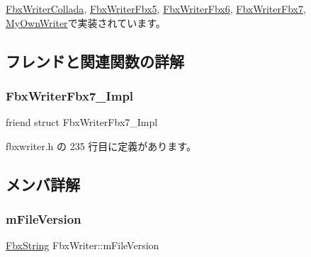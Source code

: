 \hyperlink{class_fbx_writer_collada_aaf5a632f5fa72c521d578ad17ae0aea1}{Fbx\+Writer\+Collada}, \hyperlink{class_fbx_writer_fbx5_a50a64e5e28a3ae1a89aa7107b80b7d26}{Fbx\+Writer\+Fbx5}, \hyperlink{class_fbx_writer_fbx6_a27073868a5a3c4b315e443032916d7d7}{Fbx\+Writer\+Fbx6}, \hyperlink{class_fbx_writer_fbx7_abc9fcf2cf7e1ed96f87bdc67f05f9545}{Fbx\+Writer\+Fbx7}, \hyperlink{class_my_own_writer_a7ec7a323efec7306c17198a469667d1e}{My\+Own\+Writer}で実装されています。



\subsection{フレンドと関連関数の詳解}
\mbox{\label{class_fbx_writer_af1c8c15ac15cf43655af7772383daefd}} 
\subsubsection{\texorpdfstring{Fbx\+Writer\+Fbx7\+\_\+\+Impl}{FbxWriterFbx7\_Impl}}
{\footnotesize\ttfamily friend struct Fbx\+Writer\+Fbx7\+\_\+\+Impl\hspace{0.3cm}{\ttfamily [friend]}}



 fbxwriter.\+h の 235 行目に定義があります。



\subsection{メンバ詳解}
\mbox{\label{class_fbx_writer_a134d9a05d8c34cae98d3c782b98ea801}} 
\subsubsection{\texorpdfstring{m\+File\+Version}{mFileVersion}}
{\footnotesize\ttfamily \hyperlink{class_fbx_string}{Fbx\+String} Fbx\+Writer\+::m\+File\+Version\hspace{0.3cm}{\ttfamily [protected]}}



